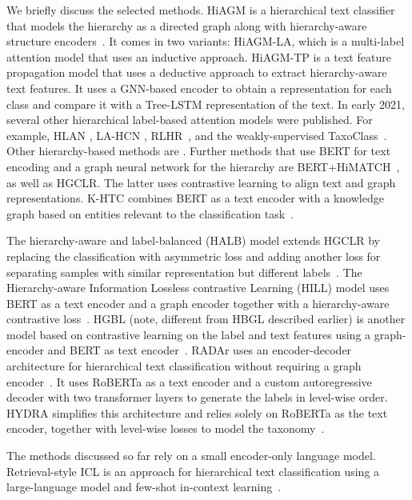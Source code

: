 \documentclass[lettersize,journal]{IEEEtran}
\begin{document}
We briefly discuss the selected methods.
HiAGM is a hierarchical text classifier that models the hierarchy as a directed graph along with hierarchy-aware structure encoders~\cite{hiagm}.  
It comes in two variants: HiAGM-LA, which is a multi-label attention model that uses an inductive approach.  
HiAGM-TP is a text feature propagation model that uses a deductive approach to extract hierarchy-aware text features. It uses a GNN-based encoder to obtain a representation for each class and compare it with a Tree-LSTM representation of the text.  
In early 2021, several other hierarchical label-based attention models were published.  For example, HLAN \cite{dong2021explainable}, LA-HCN \cite{DBLP:journals/corr/abs-2009-10938}, RLHR~\cite{liu2021improving}, and the
weakly-supervised Taxo\-Class~\cite{shen-etal-2021-taxoclass}.
Other hierarchy-based methods are
\cite{DBLP:journals/corr/abs-1812-11270,DBLP:conf/www/XiaoLS19,DBLP:journals/corr/abs-1909-00161}.
Further methods that use BERT for text encoding and a graph neural
network for the hierarchy are BERT+HiMATCH~\cite{DBLP:conf/acl/ChenMLY20}, as well as HGCLR.
The latter uses contrastive learning to align text and graph representations.
K-HTC combines BERT as a text encoder with a knowledge graph based on entities relevant to the classification task~\cite{DBLP:conf/acl/LiuZHWZ0C23-k-htc}. 

The hierarchy-aware and label-balanced (HALB) model extends HGCLR by replacing the classification with asymmetric loss and adding another loss for separating samples with similar representation but different labels~\cite{DBLP:journals/kbs/ZhangLSXTH24-halb}.
The Hierarchy-aware Information Lossless contrastive Learning (HILL) model uses BERT as a text encoder and a graph encoder together with a hierarchy-aware contrastive loss~\cite{hill2024}.
HGBL (note, different from HBGL described earlier) is another model based on contrastive learning on the label and text features using a graph-encoder and BERT as text encoder~\cite{DBLP:journals/npl/ZhangDLZ25-hgbl}.
RADAr uses an encoder-decoder architecture for hierarchical text classification without requiring a graph encoder~\cite{radar}.
It uses RoBERTa as a text encoder and a custom autoregressive decoder with two transformer layers to generate the labels in level-wise order.
HYDRA simplifies this architecture and relies solely on RoBERTa as the text encoder, together with level-wise losses to model the taxonomy~\cite{hydra}.  

The methods discussed so far rely on a small encoder-only language model.
Retrieval-style ICL is an approach for hierarchical text classification using a large-language model and few-shot in-context learning~\cite{DBLP:journals/corr/abs-2406-17534-retrieval-style}.
\end{document}
